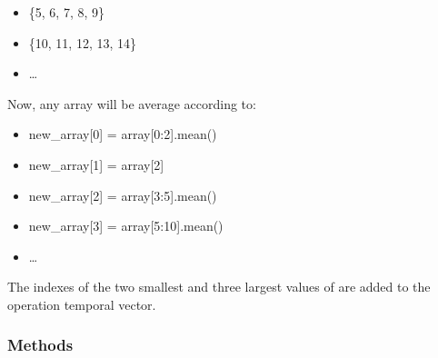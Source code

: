\documentclass[letterpaper,10pt,english]{sphinxmanual}
\begin{document}
\begin{fulllineitems}
\begin{fulllineitems}
\begin{itemize}
\item {} 
\sphinxAtStartPar
\{5, 6, 7, 8, 9\}

\item {} 
\sphinxAtStartPar
\{10, 11, 12, 13, 14\}

\item {} 
\sphinxAtStartPar
…

\end{itemize}

\sphinxAtStartPar
Now, any array will be average according to:
\begin{itemize}
\item {} 
\sphinxAtStartPar
new\_array{[}0{]} = array{[}0:2{]}.mean()

\item {} 
\sphinxAtStartPar
new\_array{[}1{]} = array{[}2{]}

\item {} 
\sphinxAtStartPar
new\_array{[}2{]} = array{[}3:5{]}.mean()

\item {} 
\sphinxAtStartPar
new\_array{[}3{]} = array{[}5:10{]}.mean()

\item {} 
\sphinxAtStartPar
…

\end{itemize}

\begin{sphinxVerbatim}[commandchars=\\\{\}]
  
\end{sphinxVerbatim}

\sphinxAtStartPar
The indexes of the two smallest and three largest values of  are added to the operation temporal vector.

\end{fulllineitems}

\subsubsection*{Methods}


\begin{savenotes}\sphinxattablestart
\centering
\begin{tabulary}{\linewidth}[t]{}
\hline


\end{tabulary}
\end{savenotes}
\end{fulllineitems}
\end{document}
